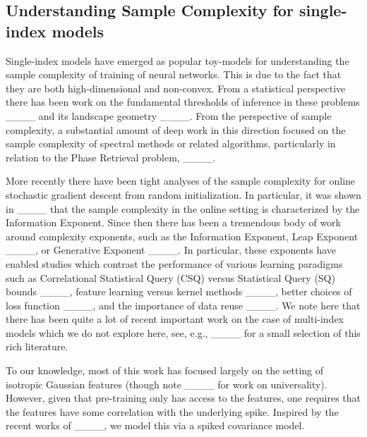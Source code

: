 \subsection{Understanding Sample Complexity for single-index models}

 Single-index models have emerged as popular toy-models for understanding the sample complexity of training of neural networks. This is due to the fact that they are both high-dimensional and non-convex. From a statistical perspective there has been work on the fundamental thresholds of inference in these problems ____ and its landscape geometry ____. From the perspective of sample complexity, a substantial amount of deep work in this direction focused on the sample complexity  of spectral methods or related algorithms, particularly in relation to the Phase Retrieval problem, ____.  


More recently there have been tight analyses of the sample complexity for online stochastic gradient descent from random initialization.
In particular, it was shown in ____ that the sample complexity in the online setting is characterized by the Information Exponent. Since then there has been a tremendous body of work around complexity exponents, such as the Information Exponent, Leap Exponent ____, or Generative Exponent ____. In particular, these exponents have enabled studies which contrast the performance of various learning paradigms such as Correlational Statistical Query (CSQ) versus Statistical Query (SQ) bounds ____, feature learning versus kernel methods ____, better choices of loss function ____, and the importance of data reuse ____.  We note here that there has been quite a lot of recent important work on the case of multi-index models which we do not explore here, see, e.g., ____ for a small selection of this rich literature.  


To our knowledge, most of this work has focused largely on the setting of isotropic Gaussian features (though note ____ for work on universality). However, given that pre-training only has access to the features, one requires that the features have some correlation with the underlying spike. Inspired by the recent works of ____, we model this via a spiked covariance model.